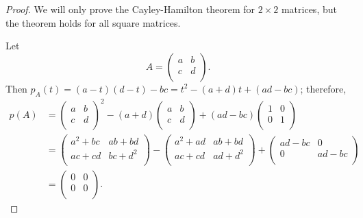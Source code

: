 \begin{proof}
    We will only prove the Cayley-Hamilton theorem for $2 \times 2$ matrices, but the theorem holds for all square matrices.
    
    Let
    \[
        A =
        \begin{pmatrix}
            a & b \\
            c & d \\
        \end{pmatrix}
        .
    \]
    Then $p_A(t) = (a-t)(d-t) - bc = t^2 - (a + d) t + (ad - bc)$; therefore,
    \begin{align*}
        p(A) &= 
        \begin{pmatrix}
            a & b \\
            c & d \\
        \end{pmatrix}
        ^2 - (a + d)
        \begin{pmatrix}
            a & b \\
            c & d \\
        \end{pmatrix}
        + (ad - bc)
        \begin{pmatrix}
            1 & 0 \\
            0 & 1 \\
        \end{pmatrix}
        \\
        &=
        \begin{pmatrix}
            a^2 + bc & ab + bd \\
            ac + cd & bc + d^2 \\
        \end{pmatrix}
        -
        \begin{pmatrix}
            a^2 + ad & ab + bd \\
            ac + cd & ad + d^2 \\
        \end{pmatrix}
        +
        \begin{pmatrix}
            ad - bc & 0 \\
            0 & ad - bc \\
        \end{pmatrix} \\
        &=
        \begin{pmatrix}
            0 & 0 \\
            0 & 0 \\
        \end{pmatrix}
        .
    \end{align*}
\end{proof}

